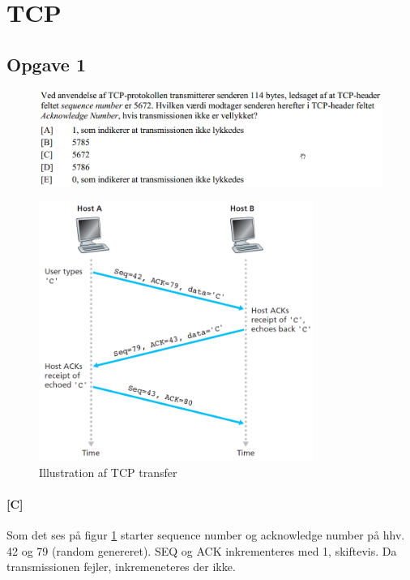 \section{TCP}
\subsection{Opgave 1}
\begin{figure}[H]
	\centering
	\includegraphics[width=\linewidth]{figs/tcp/SE15OP1}
\end{figure}

\begin{figure}[h]
	\centering
	\includegraphics[width=0.8\textwidth]{figs/tcp/tcptransfer}
	\caption{Illustration af TCP transfer}
	\label{fig:TCPtransfer}
\end{figure}

\paragraph{[C]}Som det ses på figur \ref{fig:TCPtransfer} starter sequence number og acknowledge number på hhv. 42 og 79 (random genereret). SEQ og ACK inkrementeres med 1, skiftevis. Da transmissionen fejler, inkremeneteres der ikke.